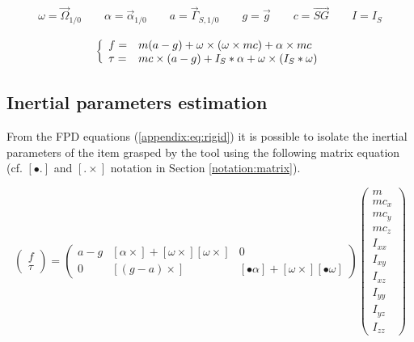\documentclass[\main/main.tex]{subfiles}
\begin{document}
\begin{align*}
 \omega = \overrightarrow{\Omega}_{1/0} \qquad \alpha = \overrightarrow{\alpha}_{1/0} \qquad a = \overrightarrow{\Gamma}_{S, 1/0} \qquad g = \overrightarrow{g} \qquad c  = \overrightarrow{SG} \qquad I = I_{S}
\end{align*}

\begin{equation}
 \label{appendix:eq:rigid}
 \left \{
 \begin{array}{l l}
  f =    & m (a - g) + \omega \times (\omega \times m c) + \alpha \times m c \\
  \tau = & m c \times (a - g)
  + I_{S} \ast \alpha + \omega \times (I_{S} \ast \omega)
 \end{array}
 \right.
\end{equation}

\subsection{Inertial parameters estimation}
\label{appendix:rigid:inertia_estimation}

From the \ac{FPD} equations (\ref{appendix:eq:rigid}) it is possible to isolate the inertial parameters of the item grasped by the tool using the following matrix equation (cf. $\left[ \bullet . \right]$ and $\left[. \times \right]$ notation in Section \ref{notation:matrix}).

\begin{equation}
 \begin{pmatrix}
  f    \\
  \tau
 \end{pmatrix}
 =
 \begin{pmatrix}
  a - g & \left[ \alpha \times \right] +  \left[ \omega \times \right] \left[ \omega \times \right] & 0                                                                                                             \\
  0     & \left[ (g - a) \times \right]                                                                                & \left[ \bullet \alpha \right] + \left[ \omega \times \right] \left[ \bullet \omega \right]
 \end{pmatrix}
 \begin{pmatrix}
  m      \\
  m c_x  \\
  m c_y  \\
  m c_z  \\
  I_{xx} \\
  I_{xy} \\
  I_{xz} \\
  I_{yy} \\
  I_{yz} \\
  I_{zz}
 \end{pmatrix}
\end{equation}
\end{document}
